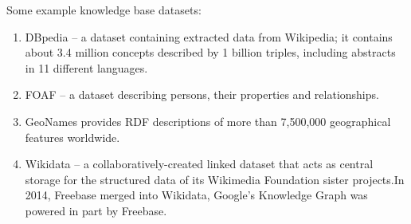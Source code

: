 Some example knowledge base datasets:

\begin{enumerate}
    \item 
    DBpedia – a dataset containing extracted data from Wikipedia; it contains about 3.4 million concepts described by 1 billion triples, including abstracts in 11 different languages.
    \item
    FOAF \cite{FOAF} – a dataset describing persons, their properties and relationships.
    \item
    GeoNames provides RDF descriptions of more than 7,500,000 geographical features worldwide.
    \item
    Wikidata – a collaboratively-created linked dataset that acts as central storage for the structured data of its Wikimedia Foundation sister projects.In 2014, Freebase \cite{Freebase} merged into Wikidata, Google's Knowledge Graph was powered in part by Freebase.
\end{enumerate}
